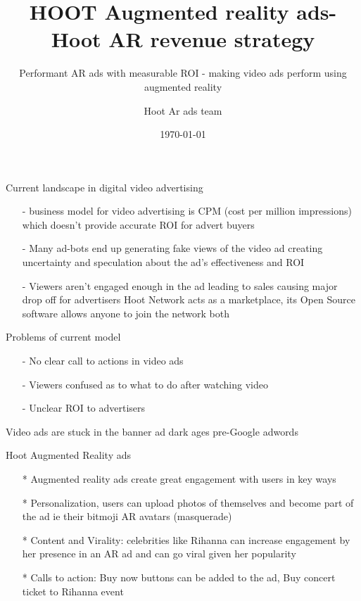 \documentclass[10pt]{beamer}
\title{HOOT Augmented reality ads- Hoot AR revenue strategy}
\subtitle{Performant AR ads with measurable ROI  - making video ads perform using augmented reality}
\date{\today}
\author{Hoot Ar ads team}
\institute{Hoot Live inc., a Delaware C-corp}
\begin{document}
\maketitle



\begin{frame}[fragile]{Current landscape in digital video advertising }

\begin{itemize}
\item[-]business model for video advertising is CPM (cost per million impressions) which doesn’t provide accurate ROI for advert buyers
  
\item[-]Many ad-bots end up generating fake views of the video ad creating uncertainty and speculation about the ad’s effectiveness and ROI
\item[-]Viewers aren’t engaged enough in the ad leading to sales causing major drop off for advertisers
Hoot Network acts as a marketplace, its Open Source software allows anyone to join the network both 
\end{itemize}

\end{frame}
\begin{frame}[t]{Problems of current model}
\begin{itemize}
\item[-]No clear call to actions in video ads
\item[-]Viewers confused as to what to do after watching video
\item[-]Unclear ROI to advertisers
\end{itemize}

Video ads are stuck in the banner ad dark ages pre-Google adwords 

\end{frame}
\begin{frame}[t]{Hoot Augmented Reality ads }
\begin{itemize}
\item[*]Augmented reality ads create great engagement with users in key ways
\item[*]Personalization, users can upload photos of themselves and become part of the ad ie their  bitmoji AR avatars (masquerade) 
\item[*]Content and Virality: celebrities like Rihanna can increase engagement by her presence in an AR ad and can go viral given her popularity
\item[*]Calls to action: Buy now buttons can be added to the ad, Buy concert ticket to Rihanna event
\end{itemize}
\end{frame}
\end{document}
